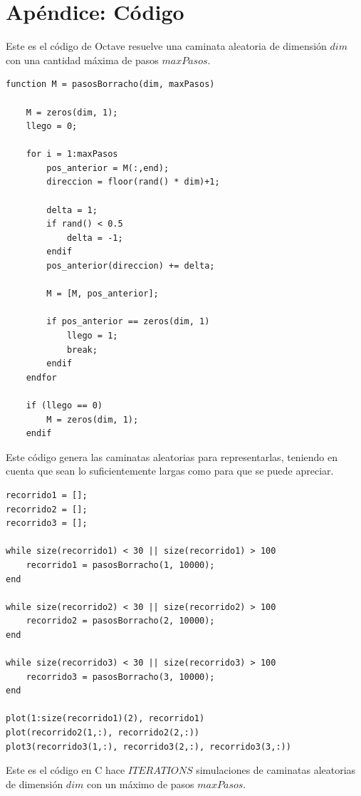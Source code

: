 \documentclass[a4paper,10pt]{article}
\begin{document}
\newpage
\section{Apéndice: Código}
Este es el c\'odigo de Octave resuelve una caminata aleatoria de dimensi\'on $dim$ con una cantidad m\'axima de pasos $maxPasos$.
\begin{lstlisting}
function M = pasosBorracho(dim, maxPasos)

	M = zeros(dim, 1);
	llego = 0;

	for i = 1:maxPasos
		pos_anterior = M(:,end);
		direccion = floor(rand() * dim)+1;

		delta = 1;
		if rand() < 0.5
			delta = -1;
		endif
		pos_anterior(direccion) += delta;

		M = [M, pos_anterior];

		if pos_anterior == zeros(dim, 1)
			llego = 1;
			break;
		endif
	endfor

	if (llego == 0)
		M = zeros(dim, 1);
	endif
\end{lstlisting}
Este c\'odigo genera las caminatas aleatorias para representarlas, teniendo en cuenta que sean lo suficientemente largas como para
que se puede apreciar. 
\begin{lstlisting}
recorrido1 = [];
recorrido2 = [];
recorrido3 = [];

while size(recorrido1) < 30 || size(recorrido1) > 100
	recorrido1 = pasosBorracho(1, 10000);
end

while size(recorrido2) < 30 || size(recorrido2) > 100
	recorrido2 = pasosBorracho(2, 10000);
end

while size(recorrido3) < 30 || size(recorrido3) > 100
	recorrido3 = pasosBorracho(3, 10000);
end

plot(1:size(recorrido1)(2), recorrido1)
plot(recorrido2(1,:), recorrido2(2,:))
plot3(recorrido3(1,:), recorrido3(2,:), recorrido3(3,:))
\end{lstlisting}
Este es el c\'odigo en C hace $ITERATIONS$ simulaciones de caminatas aleatorias de dimensi\'on $dim$ con un m\'aximo de pasos
$maxPasos$.
\end{document}
